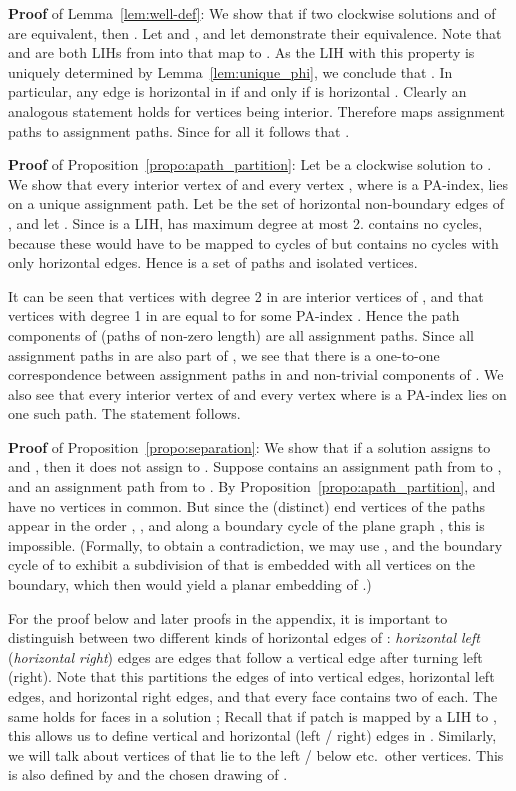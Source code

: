 \documentclass{llncs}
\newcommand{\QED}{\hspace*{\fill}{}\medskip}
\def\term#1{{\em #1}\marginpar{\raggedright{\small\it #1}}}
\begin{document}
{\bf Proof} of Lemma~\ref{lem:well-def}:
We show that if two clockwise solutions  and  of  are equivalent, then .
Let  and , and let  demonstrate their equivalence. 
Note that  and  are both LIHs from  into  that map  to . As the LIH with this property is uniquely determined by Lemma~\ref{lem:unique_phi}, we conclude that .
In particular, any edge  is horizontal in  if and only if  is horizontal . Clearly an analogous statement holds for vertices being interior. Therefore  maps assignment paths to assignment paths. Since  for all  it follows that .
\QED


{\bf Proof} of Proposition~\ref{propo:apath_partition}:
Let  be a clockwise solution to . We show that every interior vertex of  and every vertex , where  is a PA-index, lies on a unique assignment path.
Let  be the set of horizontal non-boundary edges of , 
and let . 
Since  is a LIH,  has maximum degree at most 2.  contains no cycles, because these would have to be mapped to cycles of  but  contains no cycles with only horizontal edges. Hence  is a set of paths and isolated vertices.

It can be seen that vertices with degree 2 in  are interior vertices of , and that vertices with degree 1 in  are equal to  for some PA-index .
Hence the path components of  (paths of non-zero length)
are all assignment paths. 
Since all assignment paths in  are also part of , we see that there is a one-to-one correspondence between assignment paths in  and non-trivial components of . 
We also see that every interior vertex of  and every vertex  where  is a PA-index lies on one such path. The statement follows.\QED


{\bf Proof} of Proposition~\ref{propo:separation}:
We show that if a solution  assigns  to  and , then it does not assign  to .
Suppose  contains an assignment path  from  to , and an assignment path  from  to . 
By Proposition~\ref{propo:apath_partition},  and  have no vertices in common.
But since the (distinct) end vertices of the paths appear in the order , ,  and  along a boundary cycle of the plane graph , this is impossible.
(Formally, to obtain a contradiction, we may use ,  and the boundary cycle of  to exhibit a subdivision of  that is embedded with all vertices on the boundary, which then would yield a planar embedding of .)
\QED


For the proof below and later proofs in the appendix, it is important to distinguish between two different kinds of horizontal edges of : \term{horizontal left} (\term{horizontal right}) edges are edges that follow a vertical edge after turning left (right). Note that this partitions the edges of  into vertical edges, horizontal left edges, and horizontal right edges, and that every face contains two of each. The same holds for faces in a solution ;
Recall that if patch  is mapped by a LIH  to , this allows us to define vertical and horizontal (left / right) edges in . Similarly, we will talk about vertices of  that lie to the left / below etc.\ other vertices. This is also defined by  and the chosen drawing of .
\end{document}

